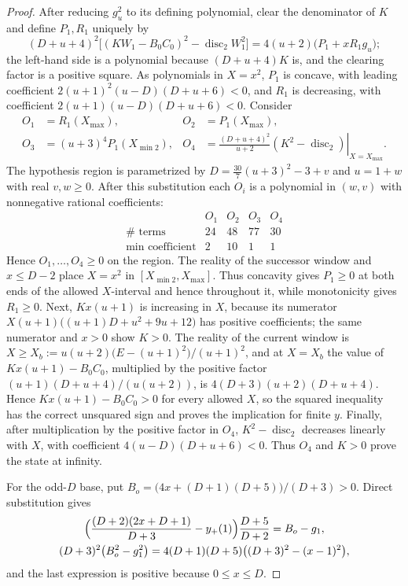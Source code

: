 \documentclass[twoside,10pt]{article}
\numberwithin{equation}{section}
\theoremstyle{slbody}
\theoremstyle{definition}
\theoremstyle{remark}
\numberwithin{theorem}{section}
\DeclareMathOperator{\disc}{disc}
\begin{document}
\begin{proof}
After reducing $g_u^2$ to its defining polynomial, clear the
denominator of $K$ and define $P_1,R_1$ uniquely by
\[
 (D+u+4)^2\bigl[(KW_1-B_0C_0)^2-\disc_2W_1^2\bigr]
   =4(u+2)\bigl(P_1+xR_1g_u\bigr);
\]
the left-hand side is a polynomial because $(D+u+4)K$ is, and the
clearing factor is a positive square.
As polynomials in $X=x^2$, $P_1$ is concave, with leading coefficient
$2(u+1)^2(u-D)(D+u+6)<0$, and $R_1$ is decreasing, with coefficient
$2(u+1)(u-D)(D+u+6)<0$.  Consider
\[
\begin{aligned}
 O_1&=R_1(X_{\max}),&
 O_2&=P_1(X_{\max}),\\
 O_3&=(u+3)^4P_1(X_{\min2}),&
 O_4&=\left.
 \frac{(D+u+4)^2}{u+2}(K^2-\disc_2)\right|_{X=X_{\max}} .
\end{aligned}
\]
The hypothesis region is parametrized by $D=\tfrac{30}{7}(u+3)^2-3+v$ and
$u=1+w$ with real $v,w\ge0$.  After this substitution each $O_i$ is a
polynomial in $(w,v)$ with nonnegative rational coefficients:
\[
\begin{array}{c|rrrr}
&O_1&O_2&O_3&O_4\\ \hline
\#\text{ terms}&24&48&77&30\\
\min\text{ coefficient}&2&10&1&1
\end{array}
\]
Hence $O_1,\dots,O_4\ge0$ on the region.
The reality of the successor window and $x\le D-2$ place
$X=x^2$ in $[X_{\min2},X_{\max}]$.  Thus concavity
gives $P_1\ge0$ at both ends of the allowed
$X$-interval and hence throughout it, while monotonicity gives $R_1\ge0$.
Next, $Kx(u+1)$ is increasing in $X$, because its numerator
$X(u+1)\bigl((u+1)D+u^2+9u+12\bigr)$ has positive coefficients; the
same numerator and $x>0$ show $K>0$.  The reality of the current window is
$X\ge X_b:=u(u+2)\bigl(E-(u+1)^2\bigr)/(u+1)^2$, and at $X=X_b$ the value of
$Kx(u+1)-B_0C_0$, multiplied by the positive factor
$(u+1)(D+u+4)/(u(u+2))$, is $4(D+3)(u+2)(D+u+4)$.  Hence
$Kx(u+1)-B_0C_0>0$ for every allowed $X$, so the squared inequality
has the correct unsquared sign and proves the implication for finite $y$.
Finally, after multiplication by the positive factor in $O_4$,
$K^2-\disc_2$ decreases linearly with $X$, with coefficient
$4(u-D)(D+u+6)<0$.  Thus $O_4$ and $K>0$ prove the state at infinity.

For the odd-$D$ base, put $B_o=\bigl(4x+(D+1)(D+5)\bigr)/(D+3)>0$.  Direct
substitution gives
\[
\begin{gathered}
 \Bigl(\frac{(D+2)(2x+D+1)}{D+3}-y_+(1)\Bigr)\frac{D+5}{D+2}=B_o-g_1,\\
 (D+3)^2\bigl(B_o^2-g_1^2\bigr)=4(D+1)(D+5)\bigl((D+3)^2-(x-1)^2\bigr),
\end{gathered}
\]
and the last expression is positive because $0\le x\le D$.
\end{proof}
\end{document}
